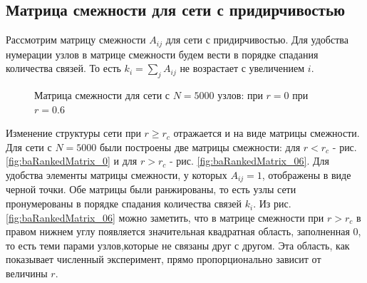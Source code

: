 \documentclass[10pt,aps,pra]{revtex4-1}
\begin{document}
    \subsection{Матрица смежности для сети с придирчивостью}

        Рассмотрим матрицу смежности $A_{ij}$ для сети с придирчивостью. Для удобства нумерации узлов в матрице смежности будем вести в порядке спадания количества связей. То есть $k_i=\sum\limits_{j}A_{ij}$ не возрастает с увеличением $i$.

            \begin{figure}[H]  
                \centering

                \caption{
                    \label{fig:baRankedMatrix}
                    Матрица смежности для сети с $N=5000$ узлов:
                      при $r=0$
                     при $r=0.6$
                }
            \end{figure}

        Изменение структуры сети при $r \geq r_c$ отражается и на виде матрицы смежности. Для сети с $N=5000$ были построены две матрицы смежности: для $r<r_c$ - рис. \ref{fig:baRankedMatrix_0} и для $r>r_c$ - рис. \ref{fig:baRankedMatrix_06}. Для удобства элементы матрицы смежности, у которых $A_{ij}=1$, отображены  в виде черной точки. Обе матрицы были ранжированы, то есть узлы сети пронумерованы в порядке спадания количества связей $k_i$. Из рис. \ref{fig:baRankedMatrix_06} можно заметить, что в матрице смежности при $r>r_c$ в правом нижнем углу появляется значительная квадратная область, заполненная 0, то есть теми парами узлов,которые не связаны друг с другом. Эта область, как показывает численный эксперимент, прямо пропорционально зависит от величины $r$.
\end{document}
